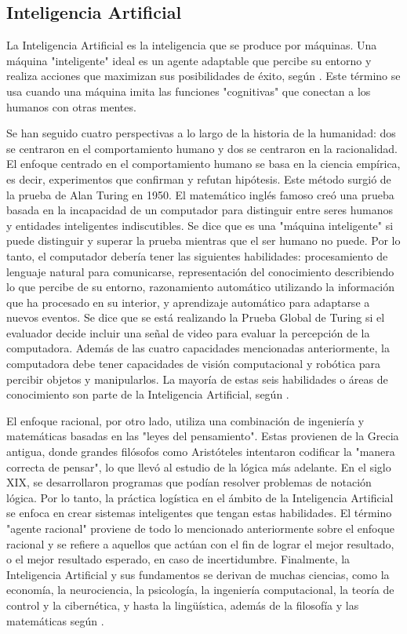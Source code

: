 \subsection{Inteligencia Artificial}

La Inteligencia Artificial es la inteligencia que se produce por máquinas. Una máquina "inteligente" ideal es un agente adaptable que percibe su entorno y realiza acciones que maximizan sus posibilidades de éxito, según \parencite{tec_poole1998machinelearning}. Este término se usa cuando una máquina imita las funciones "cognitivas" que conectan a los humanos con otras mentes.

Se han seguido cuatro perspectivas a lo largo de la historia de la humanidad: dos se centraron en el comportamiento humano y dos se centraron en la racionalidad. El enfoque centrado en el comportamiento humano se basa en la ciencia empírica, es decir, experimentos que confirman y refutan hipótesis. Este método surgió de la prueba de Alan Turing en 1950. El matemático inglés famoso creó una prueba basada en la incapacidad de un computador para distinguir entre seres humanos y entidades inteligentes indiscutibles. Se dice que es una "máquina inteligente" si puede distinguir y superar la prueba mientras que el ser humano no puede. Por lo tanto, el computador debería tener las siguientes habilidades: procesamiento de lenguaje natural para comunicarse, representación del conocimiento describiendo lo que percibe de su entorno, razonamiento automático utilizando la información que ha procesado en su interior, y aprendizaje automático para adaptarse a nuevos eventos. Se dice que se está realizando la Prueba Global de Turing si el evaluador decide incluir una señal de video para evaluar la percepción de la computadora. Además de las cuatro capacidades mencionadas anteriormente, la computadora debe tener capacidades de visión computacional y robótica para percibir objetos y manipularlos. La mayoría de estas seis habilidades o áreas de conocimiento son parte de la Inteligencia Artificial, según \parencite{bk_russell2004intart}.

El enfoque racional, por otro lado, utiliza una combinación de ingeniería y matemáticas basadas en las "leyes del pensamiento". Estas provienen de la Grecia antigua, donde grandes filósofos como Aristóteles intentaron codificar la "manera correcta de pensar", lo que llevó al estudio de la lógica más adelante. En el siglo XIX, se desarrollaron programas que podían resolver problemas de notación lógica. Por lo tanto, la práctica logística en el ámbito de la Inteligencia Artificial se enfoca en crear sistemas inteligentes que tengan estas habilidades. El término "agente racional" proviene de todo lo mencionado anteriormente sobre el enfoque racional y se refiere a aquellos que actúan con el fin de lograr el mejor resultado, o el mejor resultado esperado, en caso de incertidumbre. Finalmente, la Inteligencia Artificial y sus fundamentos se derivan de muchas ciencias, como la economía, la neurociencia, la psicología, la ingeniería computacional, la teoría de control y la cibernética, y hasta la lingüística, además de la filosofía y las matemáticas según \parencite{bk_russell2004intart}.

